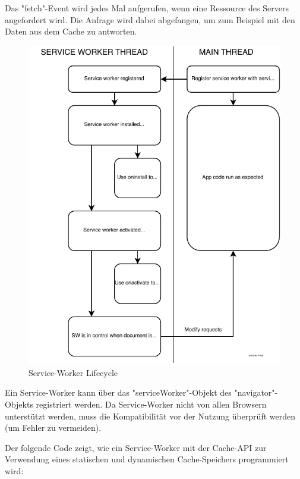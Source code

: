 
Das "{\ttfamily fetch}"-Event wird jedes Mal aufgerufen, wenn eine Ressource des Servers angefordert wird. Die Anfrage wird dabei abgefangen, um zum Beispiel mit den Daten aus dem Cache zu antworten.

\begin{figure}[H]
    \centering
    \includegraphics{media/ServiceWorker/lifecycle.svg.pdf}
    \caption{Service-Worker Lifecycle}
\end{figure}


Ein Service-Worker kann über das "{\ttfamily serviceWorker}"-Objekt des "{\ttfamily navigator}"-Objekts registriert werden. 
Da Service-Worker nicht von allen Browsern unterstützt werden, muss die Kompatibilität vor der Nutzung überprüft werden (um Fehler zu vermeiden).


\label{sec:cacheImpl}

Der folgende Code zeigt, wie ein Service-Worker mit der Cache-API zur Verwendung eines statischen und dynamischen Cache-Speichers programmiert wird:

